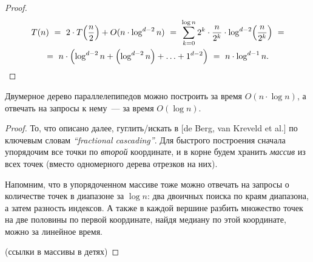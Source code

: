 \documentclass[a4paper,11pt]{article}
\begin{document}
\begin{proof}  \begin{multline*}
  T(n)\ =\ 2 \cdot T \lr*{\frac n 2} + O (n \cdot \log^{d-2} n)\ =\ 
  \sum_{k = 0}^{\log n} 2^k \cdot \frac{n}{2^k} \cdot
    \log^{d-2} \lr*{\frac{n}{2^k}}\ = \\
  =\ n \cdot \lr*{\log^{d-2} n + \lr*{\log^{d-2} n}
    + \ldots + 1^{d-2}}
  \ =\ n \cdot \log^{d-1} n.
\end{multline*}  \end{proof}

\begin{theorem}
  Двумерное дерево параллелепипедов можно построить за время
  \(O (n \cdot \log n)\), а отвечать на запросы к нему~—
  за время \(O (\log n)\).
\end{theorem}

\begin{proof}
  То, что описано далее, гуглить/искать в [de Berg, van Kreveld et al.]
  по ключевым словам \emph{``fractional cascading''}.
  Для быстрого построения сначала упорядочим все точки по
  \emph{второй} координате, и в корне будем хранить \emph{массив}
  из всех точек (вместо одномерного дерева отрезков на них).
  
  Напомним, что в упорядоченном массиве тоже можно отвечать на запросы
  о количестве точек в диапазоне за \(\log n\): два двоичных поиска
  по краям диапазона, а затем разность индексов. А также в каждой вершине
  разбить множество точек на две половины по первой координате, найдя
  медиану по этой координате, можно за линейное время.
  
  (ссылки в массивы в детях)
\end{proof}
\end{document}
